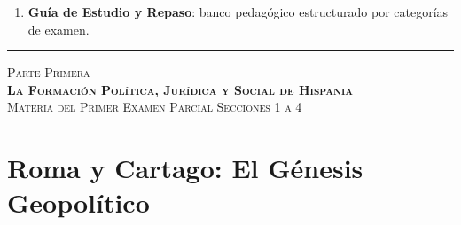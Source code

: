 \documentclass[11pt,letterpaper]{article}
\begin{document}
\begin{enumerate}[label=\textbf{\Roman*.}, leftmargin=1.5em, itemsep=0.5em]
\begin{enumerate}[label=\textbf{\Alph*.}, leftmargin=1.4em, itemsep=0.35em]
    \item \textbf{Conclusión Histórica: La Síntesis Perenne de Hispania (Preguntas 38--39)}
    \begin{itemize}[leftmargin=1.2em, itemsep=0.15em]
      \item Respuesta resolutiva a la pregunta central: concurrencia del Derecho, el orden municipal, las calzadas y la Iglesia romanizada.
      \item Compatibilidad entre pluralismo regional e identidad nacional: la unidad política no supuso homogeneidad cultural.
    \end{itemize}
  \end{enumerate}

  \item \textbf{Guía de Estudio y Repaso}: banco pedagógico estructurado por categorías de examen.
\end{enumerate}

\vspace{0.8em}
\noindent\rule{\linewidth}{0.4pt}
\vspace{0.8em}


\begin{center}
  {\Large\scshape\color{goodingWine} Parte Primera}\\[0.2em]
  {\large\bfseries\scshape La Formación Política, Jurídica y Social de Hispania}\\[0.2em]
  {\footnotesize\color{goodingSlate}\textsc{Materia del Primer Examen Parcial \quad\textbullet\quad Secciones 1 a 4}}
\end{center}
\vspace{0.4em}

\section{Roma y Cartago: El Génesis Geopolítico}
\end{document}
